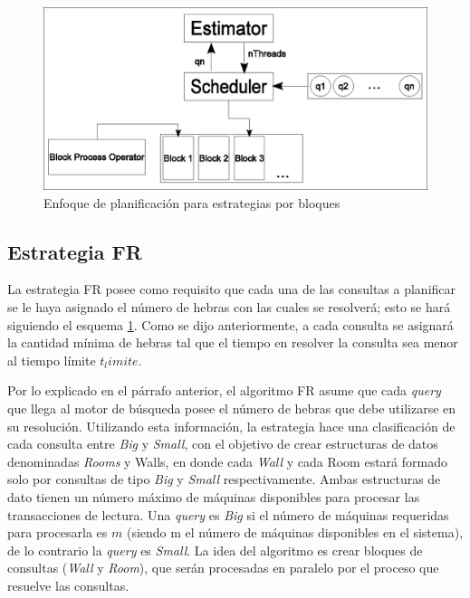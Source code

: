 \begin{figure}[!th]
\centering
\includegraphics[scale=.75]{images/scheduler_bloques.eps}
\caption{Enfoque de planificación para estrategias por bloques}
\label{fig:schedulerbloques}
\end{figure}  


\subsection{Estrategia FR}
\label{scheduling:fr}
La estrategia FR posee como requisito que cada una de las consultas a planificar se le haya asignado el número de hebras con las cuales se resolverá; esto se hará siguiendo el esquema \ref{fig:schedulerbloques}. Como se dijo anteriormente, a cada consulta se asignará la cantidad mínima de hebras tal que el tiempo en resolver la consulta sea menor al tiempo límite $t_limite$.

Por lo explicado en el párrafo anterior, el algoritmo FR asume que cada \textit{query} que llega al motor de búsqueda posee el número de hebras que debe utilizarse en su resolución. Utilizando esta información, la estrategia hace una clasificación de cada consulta entre \textit{Big} y \textit{Small}, con el objetivo de crear estructuras de datos denominadas \textit{Rooms} y {Walls}, en donde cada \textit{Wall} y cada {Room} estará formado solo por consultas de tipo \textit{Big} y \textit{Small} respectivamente. Ambas estructuras de dato tienen un número máximo de máquinas disponibles para procesar las transacciones de lectura. Una \textit{query} es \textit{Big} si el número de máquinas requeridas para procesarla es $m$ (siendo m el número de máquinas disponibles en el sistema), de lo contrario la \textit{query} es \textit{Small}. La idea del algoritmo es crear bloques de consultas (\textit{Wall} y \textit{Room}), que serán procesadas en paralelo por el proceso que resuelve las consultas. 

